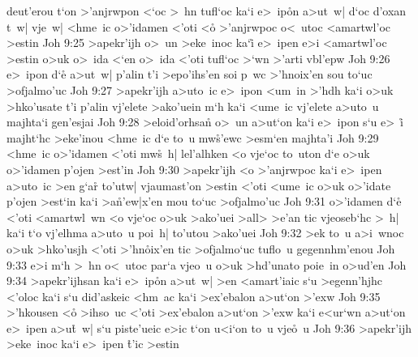 deut'erou
t`on
>'anjrwpon
<`oc
>~hn
tufl`oc
ka`i
e>~ip\r{o}n
a>ut~w|
d`oc
d'oxan
t~w|
vje~w|
<hme~ic
o>'idamen
<'oti
<o\r{}
>'anjrwpoc
o<~utoc
<amartwl'oc
>estin\bibvsend
\vs Joh 9:25
>apekr'ijh
o>~un
>eke~inoc
ka`i\r{}
e>~ipen
e>i
<amartwl'oc
>estin
o>uk
o>~ida
<`en
o>~ida
<'oti
tufl`oc
>`wn
>'arti
vbl'epw\bibvsend
\vs Joh 9:26
e>~ipon
d`e\r{}
a>ut~w|
p'alin
t'i
>epo'ihs'en
soi
p~wc
>'hnoix'en
sou
to`uc
>ofjalmo'uc\bibvsend
\vs Joh 9:27
>apekr'ijh
a>uto~ic
e>~ipon
<um~in
>'hdh
ka`i
o>uk
>hko'usate
t'i
p'alin
vj'elete
>ako'uein
m`h
ka`i
<ume~ic
vj'elete
a>uto~u
majhta`i
gen'esjai\bibvsend
\vs Joh 9:28
>eloid'orhsan\r{}
o>~un
a>ut`on
ka`i
e>~ipon
s`u
e>~i\r{}
majht`hc
>eke'inou
<hme~ic
d`e
to~u
mw\r{s}'ewc
>esm`en
majhta'i\bibvsend
\vs Joh 9:29
<hme~ic
o>'idamen
<'oti
mw\r{s}~h|
lel'alhken
<o
vje`oc
to~uton
d`e
o>uk
o>'idamen
p'ojen
>est'in\bibvsend
\vs Joh 9:30
>apekr'ijh
<o
>'anjrwpoc
ka`i
e>~ipen
a>uto~ic
>en
g`ar\r{}
to'utw|
vjaumast'on
>estin
<'oti
<ume~ic
o>uk
o>'idate
p'ojen
>est`in
ka`i
>a\r{n}'ew|x'en
mou
to`uc
>ofjalmo'uc\bibvsend
\vs Joh 9:31
o>'idamen
d`e\r{}
<'oti
<amartwl~wn
<o
vje`oc
o>uk
>ako'uei
>all>
>e'an
tic
vjeoseb`hc
>~h|
ka`i
t`o
vj'elhma
a>uto~u
poi~h|
to'utou
>ako'uei\bibvsend
\vs Joh 9:32
>ek
to~u
a>i~wnoc
o>uk
>hko'usjh
<'oti
>'hn\r{o}ix'en
tic
>ofjalmo`uc
tuflo~u
gegennhm'enou\bibvsend
\vs Joh 9:33
e>i
m`h
>~hn
o<~utoc
par`a
vjeo~u
o>uk
>hd'unato
poie~in
o>ud'en\bibvsend
\vs Joh 9:34
>apekr'ijhsan
ka`i
e>~ip\r{o}n
a>ut~w|
>en
<amart'iaic
s`u
>egenn'hjhc
<'oloc
ka`i
s`u
did'askeic
<hm~ac
ka`i
>ex'ebalon
a>ut`on
>'exw\bibvsend
\vs Joh 9:35
>'hkousen
<o\r{}
>ihso~uc
<'oti
>ex'ebalon
a>ut`on
>'exw
ka`i
e<ur`wn
a>ut`on
e>~ipen
a>u\r{t}~w|
s`u
piste'ueic
e>ic
t`on
u<i`on
to~u
vje\r{o}~u\bibvsend
{}
\vs Joh 9:36
>apekr'ijh
>eke~inoc
ka`i
e>~ipen
\r{t}'ic
>estin
